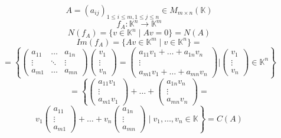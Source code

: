 \documentclass[a4paper]{article}
\theoremstyle{break}
\theoremstyle{break}
\theoremstyle{break}
\theoremstyle{break}
\begin{document}
\begin{example}
  \[
    A = (a_{ij})_{1 \le i \le m, 1 \le j \le n} \in M_{m \times n}(\mathbb{K})
  \] 
  \[
  f_A: \mathbb{K}^n \to \mathbb{K}^m
  \] 
  \[
  N(f_A) = \{v \in \mathbb{K}^n \;|\; Av = 0\} = N(A)
  \] 
  \[
  Im(f_A) = \{Av \in \mathbb{K}^m \;|\; v \in \mathbb{K}^n\} =
  \] 
  \[
  = \left\{ \begin{pmatrix} 
      a_{11} & \ldots & a_{1n}\\
      \vdots & \ddots & \vdots\\
      a_{m1} & \ldots & a_{mn}
  \end{pmatrix} \begin{pmatrix} 
  v_1 \\
  \vdots \\
  v_n
  \end{pmatrix} =
  \begin{pmatrix} 
    a_{11}v_1 + \ldots + a_{1n}v_n\\
    \vdots\\
    a_{m1}v_1 + \ldots + a_{mn}v_n
  \end{pmatrix} 
  |
  \begin{pmatrix} 
    v_1\\
    \vdots\\
    v_n
  \end{pmatrix} 
  \in \mathbb{K}^n \right\}
  \] 
  \[
  = \left\{ \begin{pmatrix} 
      a_{11}v_1\\
      \vdots\\
      a_{m1}v_1
  \end{pmatrix}
  +
  \ldots
  +
  \begin{pmatrix} 
    a_{1n}v_n\\
    \vdots\\
    a_{mn}v_n
  \end{pmatrix}
  =
  \right.
\]
\[
  \left.
  v_1 \begin{pmatrix} 
    a_{11}\\
    \vdots\\
    a_{m1}
  \end{pmatrix}
  + 
  \ldots
  +
  v_n \begin{pmatrix} 
    a_{1n}\\
    \vdots\\
    a_{mn}
  \end{pmatrix}
  \; \Big | \;
  v_1, \ldots, v_n \in \mathbb{K} \right\} = C(A)
  \] 
\end{example}
\end{document}
